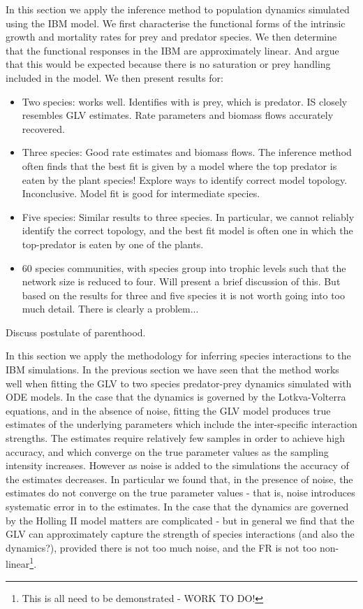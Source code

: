 In this section we apply the inference method to population dynamics simulated using the IBM model. We first characterise the functional forms of the intrinsic growth and mortality rates for prey and predator species. We then determine that the functional responses in the IBM are approximately linear. And argue that this would be expected because there is no saturation or prey handling included in the model. We then present results for:
\begin{itemize}
	\item Two species: works well. Identifies with is prey, which is predator. IS closely resembles GLV estimates. Rate parameters and biomass flows accurately recovered.
	\item Three species: Good rate estimates and biomass flows. The inference method often finds that the best fit is given by a model where the top predator is eaten by the plant species! Explore ways to identify correct model topology. Inconclusive. Model fit is good for intermediate species.
	\item Five species: Similar results to three species. In particular, we cannot reliably identify the correct topology, and the best fit model is often one in which the top-predator is eaten by one of the plants.
	\item 60 species communities, with species group into trophic levels such that the network size is reduced to four.   Will present a brief discussion of this. But based on the results for three and five species it is not worth going into too much detail. There is clearly a problem... 
\end{itemize} 
Discuss postulate of parenthood.

In this section we apply the methodology for inferring species interactions to the IBM simulations. In the previous section we have seen that the method works well when fitting the GLV to two species predator-prey dynamics simulated with ODE models. In the case that the dynamics is governed by the Lotkva-Volterra equations, and in the absence of noise, fitting the GLV model produces true estimates of the underlying parameters which include the inter-specific interaction strengths. The estimates require relatively few samples in order to achieve high accuracy, and which converge on the true parameter values as the sampling intensity increases. However as noise is added to the simulations the accuracy of the estimates decreases. In particular we found that, in the presence of noise, the estimates do not converge on the true parameter values - that is, noise introduces systematic error in to the estimates. In the case that the dynamics are governed by the Holling II model matters are complicated - but in general we find that the GLV can approximately capture the strength of species interactions (and also the dynamics?), provided there is not too much noise, and the FR is not too non-linear\footnote{This is all need to be demonstrated - WORK TO DO!}.

